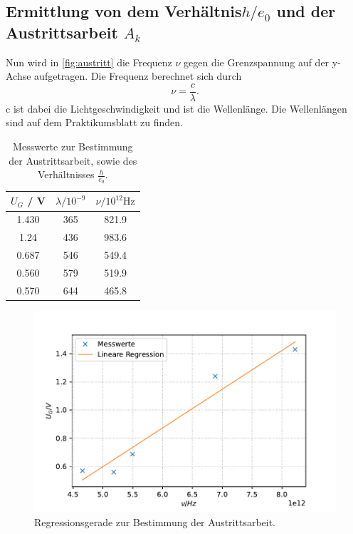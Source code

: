 \subsection{Ermittlung von dem Verhältnis$h / e_0$ und der Austrittsarbeit $A_k$}

Nun wird in \autoref{fig:austritt} die Frequenz $\nu$ gegen die Grenzspannung auf der y-Achse aufgetragen.
Die Frequenz berechnet sich durch
\begin{equation}
  \nu = \frac{c}{\lambda}.
\end{equation}
c ist dabei die Lichtgeschwindigkeit und \lambda ist die Wellenlänge.
Die Wellenlängen sind auf dem Praktikumsblatt \cite{v500} zu finden.

\begin{table}
  \centering
  \caption{Messwerte zur Bestimmung der Austrittsarbeit, sowie des Verhältnisses $\frac{h}{e_0}$.}
  \label{tab:austritt}
  \begin{tabular}{c c c}
    \toprule
    $U_G$ / V & $\lambda / 10^{-9}$ & $\nu / 10^{12} \unit\hertz$ \\
    \midrule
    1.430 & 365 & 821.9\\
    1.24 & 436 & 983.6\\
    0.687 & 546 & 549.4\\
    0.560 & 579 & 519.9\\
    0.570 & 644 & 465.8\\ %
    \bottomrule
  \end{tabular}
\end{table}

\begin{figure}
  \center
  \caption{Regressionsgerade zur Bestimmung der Austrittsarbeit.}\label{fig:austritt}
  \includegraphics[width=0.8\linewidth]{pictures/austritt.pdf}
\end{figure}

